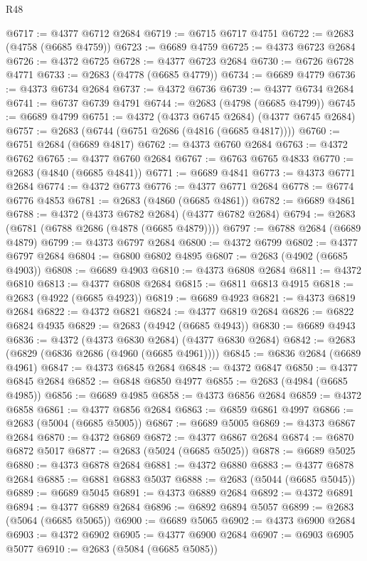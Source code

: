 \begin{lexlean}{R48}
\begin{coremodule}
@6717 := @4377 @6712 @2684
@6719 := @6715 @6717 @4751
@6722 := @2683 (@4758 (@6685 @4759))
@6723 := @6689 @4759
@6725 := @4373 @6723 @2684
@6726 := @4372 @6725
@6728 := @4377 @6723 @2684
@6730 := @6726 @6728 @4771
@6733 := @2683 (@4778 (@6685 @4779))
@6734 := @6689 @4779
@6736 := @4373 @6734 @2684
@6737 := @4372 @6736
@6739 := @4377 @6734 @2684
@6741 := @6737 @6739 @4791
@6744 := @2683 (@4798 (@6685 @4799))
@6745 := @6689 @4799
@6751 := @4372 (@4373 @6745 @2684) (@4377 @6745 @2684)
@6757 := @2683 (@6744 (@6751 @2686 (@4816 (@6685 @4817))))
@6760 := @6751 @2684 (@6689 @4817)
@6762 := @4373 @6760 @2684
@6763 := @4372 @6762
@6765 := @4377 @6760 @2684
@6767 := @6763 @6765 @4833
@6770 := @2683 (@4840 (@6685 @4841))
@6771 := @6689 @4841
@6773 := @4373 @6771 @2684
@6774 := @4372 @6773
@6776 := @4377 @6771 @2684
@6778 := @6774 @6776 @4853
@6781 := @2683 (@4860 (@6685 @4861))
@6782 := @6689 @4861
@6788 := @4372 (@4373 @6782 @2684) (@4377 @6782 @2684)
@6794 := @2683 (@6781 (@6788 @2686 (@4878 (@6685 @4879))))
@6797 := @6788 @2684 (@6689 @4879)
@6799 := @4373 @6797 @2684
@6800 := @4372 @6799
@6802 := @4377 @6797 @2684
@6804 := @6800 @6802 @4895
@6807 := @2683 (@4902 (@6685 @4903))
@6808 := @6689 @4903
@6810 := @4373 @6808 @2684
@6811 := @4372 @6810
@6813 := @4377 @6808 @2684
@6815 := @6811 @6813 @4915
@6818 := @2683 (@4922 (@6685 @4923))
@6819 := @6689 @4923
@6821 := @4373 @6819 @2684
@6822 := @4372 @6821
@6824 := @4377 @6819 @2684
@6826 := @6822 @6824 @4935
@6829 := @2683 (@4942 (@6685 @4943))
@6830 := @6689 @4943
@6836 := @4372 (@4373 @6830 @2684) (@4377 @6830 @2684)
@6842 := @2683 (@6829 (@6836 @2686 (@4960 (@6685 @4961))))
@6845 := @6836 @2684 (@6689 @4961)
@6847 := @4373 @6845 @2684
@6848 := @4372 @6847
@6850 := @4377 @6845 @2684
@6852 := @6848 @6850 @4977
@6855 := @2683 (@4984 (@6685 @4985))
@6856 := @6689 @4985
@6858 := @4373 @6856 @2684
@6859 := @4372 @6858
@6861 := @4377 @6856 @2684
@6863 := @6859 @6861 @4997
@6866 := @2683 (@5004 (@6685 @5005))
@6867 := @6689 @5005
@6869 := @4373 @6867 @2684
@6870 := @4372 @6869
@6872 := @4377 @6867 @2684
@6874 := @6870 @6872 @5017
@6877 := @2683 (@5024 (@6685 @5025))
@6878 := @6689 @5025
@6880 := @4373 @6878 @2684
@6881 := @4372 @6880
@6883 := @4377 @6878 @2684
@6885 := @6881 @6883 @5037
@6888 := @2683 (@5044 (@6685 @5045))
@6889 := @6689 @5045
@6891 := @4373 @6889 @2684
@6892 := @4372 @6891
@6894 := @4377 @6889 @2684
@6896 := @6892 @6894 @5057
@6899 := @2683 (@5064 (@6685 @5065))
@6900 := @6689 @5065
@6902 := @4373 @6900 @2684
@6903 := @4372 @6902
@6905 := @4377 @6900 @2684
@6907 := @6903 @6905 @5077
@6910 := @2683 (@5084 (@6685 @5085))

\end{coremodule}
\end{lexlean}
